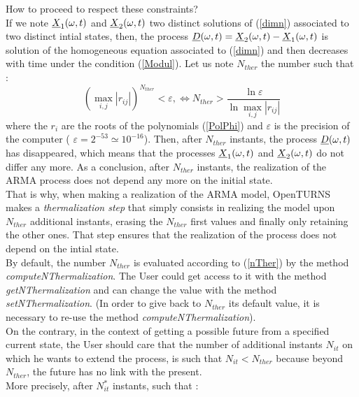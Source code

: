 How to proceed to respect these constraints?\\
If we note ${\underline{X}}_1(\omega,t)$ and  ${\underline{X}}_2(\omega,t)$ two distinct solutions of (\ref{dimn}) associated to two distinct intial states, then, the process ${\underline{D}}(\omega,t) = {\underline{X}}_2(\omega,t) - {\underline{X}}_1(\omega,t)$ is solution of the homogeneous equation associated to  (\ref{dimn}) and then decreases with time under the condition (\ref{Modul}). Let us note  $N_{ther}$ the number such that :
\begin{equation}\label{nTher}
  \left( \max_{i,j} |r_{ij}| \right)^{N_{ther}} < \varepsilon ,\Longleftrightarrow N_{ther} > \displaystyle \frac{\ln  \varepsilon}{\ln \max_{i,j} |r_{ij}|}
\end{equation}
where  the $r_i$ are the roots of the polynomials (\ref{PolPhi}) and  $\varepsilon$ is the precision of the computer ( $\varepsilon =2^{-53} \simeq 10^{-16}$). Then, after $N_{ther}$ instants, the process  ${\underline{D}}(\omega,t)$ has disappeared, which means that the processes  ${\underline{X}}_1(\omega,t)$ and  ${\underline{X}}_2(\omega,t)$ do not differ any more. As a conclusion, after  $N_{ther}$ instants, the realization of the ARMA process does not depend any more on the initial state.\\
That is why, when making a realization of the ARMA model, OpenTURNS makes a \emph{thermalization step} that simply consists in realizing the model upon $N_{ther}$ additional instants, erasing the $N_{ther}$ first values and finally only retaining the other ones. That step ensures that the realization of the process does not depend on the intial state.  \\
By default, the number  $N_{ther}$ is evaluated according to (\ref{nTher}) by the method  \emph{computeNThermalization}. The User could get access to it with the method \emph{getNThermalization} and can change the value with the method \emph{setNThermalization}. (In order to give back to $N_{ther}$ its default value, it is necessary to re-use the method  \emph{computeNThermalization}).\\

On the contrary, in the context of getting a possible future from a specified current state, the User should care that the number of additional instants $N_{it}$ on which he wants to extend the process, is such that $N_{it} <  N_{ther}$ because beyond $N_{ther}$, the future has no link with the present.\\
More precisely, after $N_{it}^*$ instants, such that :

